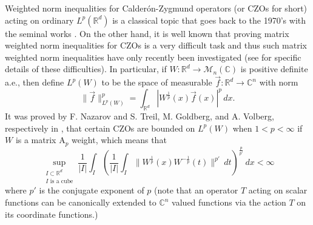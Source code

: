 \documentclass[12pt,reqno ]{amsart}
\numberwithin{equation}{section}
\theoremstyle{definition}
\newcommand{\C}{\ensuremath{\mathbb{C}^n}}
\newcommand{\R}{\ensuremath{\mathbb{R}}}
\newcommand{\Rd}{\ensuremath{\mathbb{R}^d}}
\newcommand{\Mn}{\ensuremath{\mathcal{M}_{n }}(\mathbb{C})}
\newcommand{\inrd}{\ensuremath{\int_{\Rd}}}
\begin{document}
\begin{comment}
In this paper we will use the main results from \cite{IKP} to prove matrix weighted norm inequalities for certain matrix kernelled Calderon-Zygmund operators (see \cite{IKP} for a brief history of scalar and matrix weighted norm inequalities, and especially as it pertains to this paper).  More precisely,  if $1 < p < \infty$ and $W : \Rd \rightarrow \C$ is positive definite a.e. and $I$ is any cube then recall that there exists positive definite matricies  $V_I, V_I '$ such that  $|I|^{- \frac{1}{p}} \|\chi_I W^\frac{1}{p}  \vec{e}\|_{L^p} \approx |V_I \vec{e}|$ and $|I|^{- \frac{1}{p'}} \|\chi_I W^{-\frac{1}{p}} \vec{e}\|_{L^{p'}} \approx |V_I ' \vec{e}|$ for any $\vec{e} \in \C$, where $\|\cdot \|_{L^p}$ is the canonical $L^p(\R^d;\C)$ norm. Now suppose that we are given a bounded operator $T  : L^2(\Rd; \C) \rightarrow L^2(\Rd; \C)$. We will call $T$ a ``$(W, p)$ weighted CZO" with associated matrix kernel $K: \Rd \times \Rd \backslash \Delta \rightarrow \Mn$ (where as usual $\Delta \subset \Rd \times \Rd$ is the diagonal) if the following three conditions are true: first,
\end{comment}

Weighted norm inequalities for Calder\'{o}n-Zygmund operators (or CZOs for short) acting on ordinary $L^p(\Rd)$ is a classical topic that goes back to the 1970's with the seminal works  \cite{CF, HMW}. On the other hand, it is well known that proving matrix weighted norm inequalities for CZOs is a very difficult task and thus such matrix weighted norm inequalities have only recently been investigated (see \cite{TV, V} for specific details of these difficulties).  In particular, if $W : \Rd \rightarrow \Mn$ is positive definite a.e., then define $L^p(W)$ to be the space of measurable $\vec{f} : \Rd \rightarrow \C$ with norm \begin{equation*} \|\vec{f}\|_{L^p(W)} ^p = \inrd |W^\frac{1}{p} (x) \vec{f}(x) |^p \, dx. \end{equation*} It was proved by F. Nazarov and S. Treil, M. Goldberg, and A. Volberg, respectively in \cite{NT, G, V}, that certain CZOs are bounded on $L^p(W)$ when $1 < p < \infty$ if  $W$ is a matrix A${}_p$ weight, which means that \begin{equation} \label{MatrixApDef} \sup_{\substack{I \subset \R^d \\ I \text{ is a cube}}} \frac{1}{|I|} \int_I \left( \frac{1}{|I|} \int_I \|W^{\frac{1}{p}} (x) W^{- \frac{1}{p}} (t) \|^{p'} \, dt \right)^\frac{p}{p'} \, dx  < \infty \end{equation} where $p'$ is the conjugate exponent of $p$ (note that an operator $T$ acting on scalar functions can be canonically extended to $\C$ valued functions via the action $T$ on its coordinate functions.)
\end{document}
